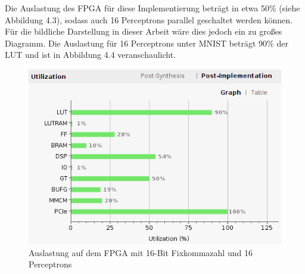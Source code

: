 Die Auslastung des FPGA für diese Implementierung beträgt in etwa 50\% (siehe Abbildung 4.3), sodass auch 16 Perceptrons parallel geschaltet werden können. Für die bildliche Darstellung in dieser Arbeit wäre dies jedoch ein zu großes Diagramm. 
Die Auslastung für 16 Perceptrons unter MNIST beträgt 90\% der LUT und ist in Abbildung 4.4 veranschaulicht. \\
\begin{figure}[ht]
\centering
\includegraphics[scale=0.95]{bilder/auslastung2}
\caption{Auslastung auf dem FPGA mit 16-Bit Fixkommazahl und 16 Perceptrons}
\end{figure}\\ 
